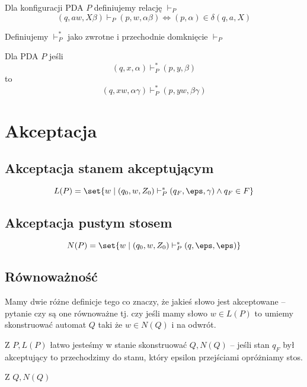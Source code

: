 \begin{definition}
    Dla konfiguracji PDA \( P \) definiujemy relację \( \vdash_P \)
    \[
        (q, aw, X\beta) \vdash_P (p, w, \alpha \beta)
        \iff
        (p, \alpha) \in \delta(q, a, X)
    \]
\end{definition}

\begin{definition}
    Definiujemy \( \vdash_P^* \) jako zwrotne i przechodnie domknięcie \( \vdash_P \)
\end{definition}

\begin{lemma}
    Dla PDA \( P \) jeśli
    \[
        (q, x, \alpha) \vdash_P^* (p, y, \beta)
    \]
    to
    \[
        (q, xw, \alpha\gamma) \vdash_P^* (p, yw, \beta\gamma)
    \]
\end{lemma}

\section{Akceptacja}
\subsection{Akceptacja stanem akceptującym}
\[
    L(P) = \set{ w \mid (q_0, w, Z_0) \vdash_P^* (q_F, \eps, \gamma) \land q_F \in F} 
\]

\subsection{Akceptacja pustym stosem}
\[
    N(P) = \set{ w \mid (q_0, w, Z_0) \vdash_P^* (q, \eps, \eps)}
\]

\subsection{Równoważność}
Mamy dwie różne definicje tego co znaczy, że jakieś słowo jest akceptowane -- pytanie czy są one równoważne tj. czy jeśli mamy słowo \( w \in L(P) \) to umiemy skonstruować automat \( Q \) taki że \( w \in N(Q)  \) i na odwrót.

Z \( P, L(P) \) łatwo jesteśmy w stanie skonstruować \( Q, N(Q) \) -- jeśli stan \( q_F \) był akceptujący to przechodzimy do stanu, który epsilon przejściami opróżniamy stos.

Z \( Q, N(Q) \) 



